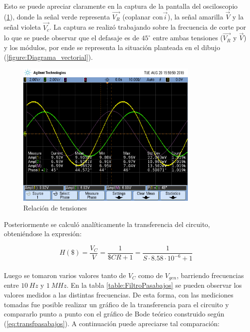 \documentclass[11pt, a4paper]{article}
\begin{document}
Esto se puede apreciar claramente en la captura de la pantalla del osciloscopio ({\ref{figure:VrvsVs}}), donde la señal verde representa $\overrightarrow{V_R}$ (coplanar con$\overrightarrow{i}$), la señal amarilla $\overrightarrow{V}$ y la señal violeta $\overrightarrow{V_c}$. La captura se realizó trabajando sobre la frecuencia de corte por lo que se puede observar que el defasaje es de $45^\circ$ entre ambas tensiones ($\overrightarrow{V_R}$ y $\overrightarrow{V}$) y los módulos, por ende se representa la situación planteada en el dibujo ({\ref{figure:Diagrama_vectorial}}).

 \begin{figure}[H]
	\centering
	\includegraphics[width=0.8\textwidth,trim={0.7cm 6.25cm  0 3.5cm},clip]{VrvsVvsVc.png}
	\caption{Relación de tensiones}
	\label{figure:VrvsVs}
\end{figure}


\par

Posteriormente se calculó analíticamente la transferencia del circuito, obteniéndose la expresión:

\begin{equation}
	H \left(\$ \right) = \frac{V_C}{V} = \frac{1}{\$CR + 1} = \frac{1}{S \cdot 8.58 \cdot 10^{-6} + 1}
	\label{eq:transfpasabajos}
\end{equation} \\

Luego se tomaron varios valores tanto de $V_C$ como de $V_{gen}$, barriendo frecuencias entre $ 10 \ Hz $ y $ 1 \ MHz $. En la tabla \ref{table:FiltroPasabajos} se pueden observar los valores medidos a las distintas frecuencias. De esta forma, con las mediciones tomadas fue posible realizar un gráfico de la transferencia para el circuito y compararlo punto a punto con el gráfico de Bode teórico construido según (\ref{eq:transfpasabajos}). A continuación puede apreciarse tal comparación:
\end{document}

